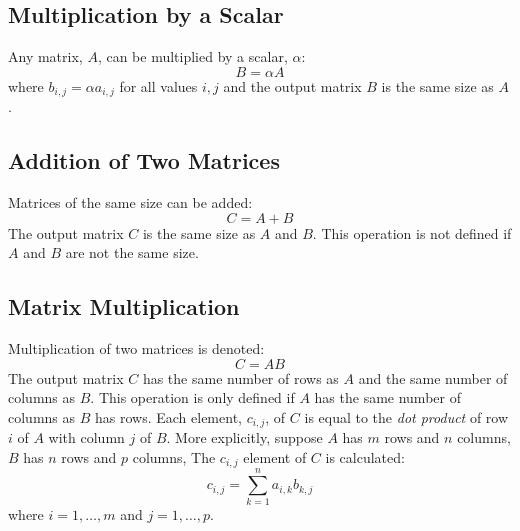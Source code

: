 \subsection{Multiplication by a Scalar}
Any matrix, $A$, can be multiplied by a scalar, $\alpha$:
\begin{equation*}
B = \alpha A
\end{equation*}
where $b_{i,j} = \alpha a_{i,j}$ for  all values $i,j$ and the output matrix $B$ is the same size as $A$.

\subsection{Addition of Two Matrices}
Matrices of the same size can be added:
\begin{equation*}
C = A + B
\end{equation*}
The output matrix $C$ is the same size as $A$ and $B$.  This operation is not defined if $A$ and $B$ are not the same size.

\subsection{Matrix Multiplication}
Multiplication of two matrices is denoted:
\begin{equation*}
C = AB
\end{equation*}
The output matrix $C$ has the same number of rows as $A$ and the same number of columns as $B$.  This operation is only defined if $A$ has the same number of columns as $B$ has rows.  Each element, $c_{i,j}$, of $C$ is equal to the \emph{dot product} of row $i$ of $A$ with column $j$ of $B$.  More explicitly, suppose $A$ has $m$ rows and $n$ columns, $B$ has $n$ rows and $p$ columns, The $c_{i,j}$ element of $C$ is calculated:
\begin{equation*}
c_{i,j} = \sum\limits_{k=1}^{n} a_{i,k}b_{k,j}
\end{equation*}
where $i=1,\dots,m$ and $j=1,\dots,p$.

